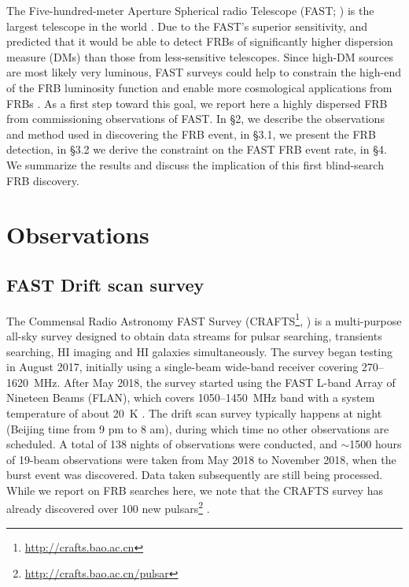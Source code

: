 The Five-hundred-meter Aperture Spherical radio Telescope
(FAST; \citealt{FAST}) is the largest telescope in the world \citep{jpy+19}.
Due to the FAST's superior sensitivity, \citet{lor18} and \citet{zhang18} predicted that it would be able to detect FRBs of significantly higher dispersion measure (DMs) than those from less-sensitive telescopes. Since high-DM sources are most likely very luminous, FAST
surveys could help to constrain the high-end of the FRB luminosity function and enable more cosmological applications from FRBs \citep{zhang18}. As a first step toward this goal,
we report here a highly dispersed FRB from commissioning observations of FAST. In \S 2, we describe the observations and method used in discovering the FRB event,  in \S 3.1, we present the FRB detection, in \S 3.2 we derive the constraint on the FAST FRB event rate, in \S 4. We summarize the results and discuss the implication of this first blind-search FRB discovery.

\section{Observations}
\subsection{FAST Drift scan survey}

The Commensal Radio Astronomy FAST Survey (CRAFTS\footnote{\url{http://crafts.bao.ac.cn}}, \citealt{li2018})  is a multi-purpose all-sky survey designed to obtain data streams for pulsar searching, transients searching, HI imaging and HI galaxies simultaneously. The survey began testing in August 2017, initially using a single-beam wide-band receiver covering 270--1620~MHz. After May 2018, the survey started using the FAST L-band Array of Nineteen Beams (FLAN), which covers 1050--1450~MHz band with a system temperature of about 20~K \citep{li2018}. 
The drift scan survey typically happens at night (Beijing time from 9 pm to 8 am),  during which time no other observations are scheduled. A total of 138 nights of observations were conducted, and $\sim$1500 hours of 19-beam observations were taken from May 2018 to November 2018, when the burst event was discovered. Data taken subsequently are still being processed.
While we report on FRB searches here, we note that the CRAFTS survey has already discovered over 100 new pulsars\footnote{\url{http://crafts.bao.ac.cn/pulsar}} \citep{qpl+19, zlh+19}.

